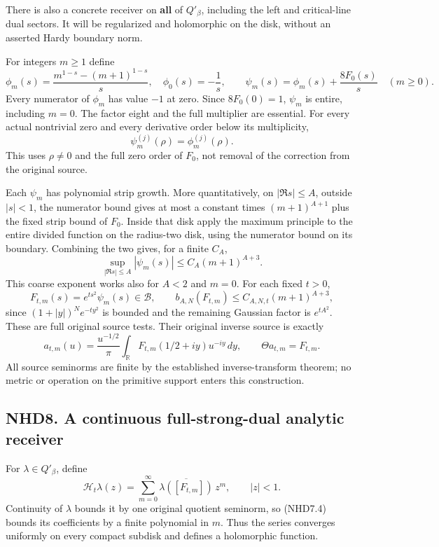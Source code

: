 There is also a concrete receiver on \textbf{all} of \(Q'_\beta\),
including the left and critical-line dual sectors. It will be
regularized and holomorphic on the disk, without an asserted Hardy
boundary norm.

For integers \(m\ge1\) define \[
\phi_m(s)=\frac{m^{1-s}-(m+1)^{1-s}}s,
\quad \phi_0(s)=-\frac1s,
\qquad
\psi_m(s)=\phi_m(s)+\frac{8F_0(s)}s\quad(m\ge0).
\tag{NHD7.1}
\] Every numerator of \(\phi_m\) has value \(-1\) at zero. Since
\(8F_0(0)=1\), \(\psi_m\) is entire, including \(m=0\). The factor eight
and the full multiplier are essential. For every actual nontrivial zero
and every derivative order below its multiplicity, \[
\psi_m^{(j)}(\rho)=\phi_m^{(j)}(\rho).
\tag{NHD7.2}
\] This uses \(\rho\ne0\) and the full zero order of \(F_0\), not
removal of the correction from the original source.

Each \(\psi_m\) has polynomial strip growth. More quantitatively, on
\(|\Re s|\le A\), outside \(|s|<1\), the numerator bound gives at most a
constant times \((m+1)^{A+1}\) plus the fixed strip bound of \(F_0\).
Inside that disk apply the maximum principle to the entire divided
function on the radius-two disk, using the numerator bound on its
boundary. Combining the two gives, for a finite \(C_A\), \[
\sup_{|\Re s|\le A}|\psi_m(s)|
\le C_A(m+1)^{A+3}.
\tag{NHD7.3}
\] This coarse exponent works also for \(A<2\) and \(m=0\). For each
fixed \(t>0\), \[
F_{t,m}(s)=e^{ts^2}\psi_m(s)\in\mathcal B,
\qquad
b_{A,N}(F_{t,m})\le C_{A,N,t}(m+1)^{A+3},
\tag{NHD7.4}
\] since \((1+|y|)^Ne^{-ty^2}\) is bounded and the remaining Gaussian
factor is \(e^{tA^2}\). These are full original source tests. Their
original inverse source is exactly \[
a_{t,m}(u)=\frac{u^{-1/2}}\pi
\int_{\mathbb R}F_{t,m}(1/2+iy)u^{-iy}\,dy,
\qquad\Theta a_{t,m}=F_{t,m}.
\tag{NHD7.5}
\] All source seminorms are finite by the established inverse-transform
theorem; no metric or operation on the primitive support enters this
construction.

\subsection{NHD8. A continuous full-strong-dual analytic
receiver}\label{nhd8.-a-continuous-full-strong-dual-analytic-receiver}

For \(\lambda\in Q'_\beta\), define \[
\mathcal H_t\lambda(z)=
\sum_{m=0}^\infty\overline{\lambda([F_{t,m}])}\,z^m,
\qquad |z|<1.
\tag{NHD8.1}
\] Continuity of \(\lambda\) bounds it by one original quotient
seminorm, so (NHD7.4) bounds its coefficients by a finite polynomial in
\(m\). Thus the series converges uniformly on every compact subdisk and
defines a holomorphic function.

